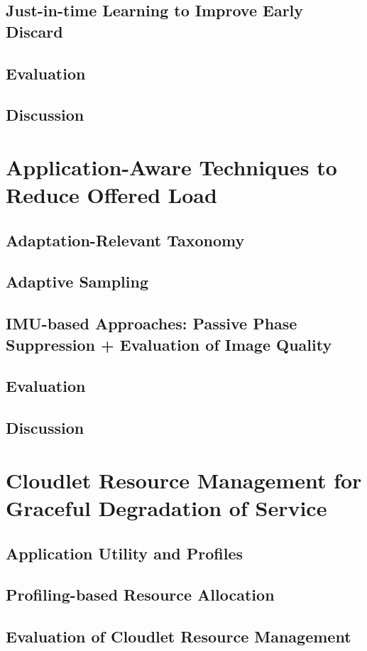 \documentclass[12pt,openany]{cmuthesis}
\begin{document}
\subsection{Just-in-time Learning to Improve Early Discard}
\subsection{Evaluation}
\subsection{Discussion}

\section{Application-Aware Techniques to Reduce Offered Load}
\subsection{Adaptation-Relevant Taxonomy}
\subsection{Adaptive Sampling}
\subsection{IMU-based Approaches: Passive Phase Suppression + Evaluation of Image Quality}
\subsection{Evaluation}
\subsection{Discussion}

\section{Cloudlet Resource Management for Graceful Degradation of Service}
\subsection{Application Utility and Profiles}
\subsection{Profiling-based Resource Allocation}
\subsection{Evaluation of Cloudlet Resource Management}
\end{document}
